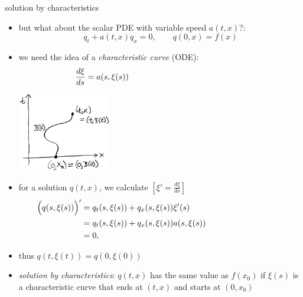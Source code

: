 \documentclass[10pt,hyperref]{beamer}
\newcommand{\ds}{\displaystyle}
\begin{document}
\begin{frame}{solution by characteristics}

\begin{itemize}
\item but what about the scalar PDE with variable speed $a(t,x)$?:
    $$q_t + a(t,x) q_x=0, \qquad q(0,x) = f(x)$$
\item we need the idea of a \emph{characteristic curve} (ODE):
    $$\ds \frac{d\xi}{ds} = a(s,\xi(s)) \hspace{50mm}$$

\vspace{-10mm}

\hfill \includegraphics[width=0.32\textwidth]{figs/characteristicsketch}

\vspace{-20mm}
\item for a solution $q(t,x)$, we calculate $\left[\xi'=\tfrac{d\xi}{ds}\right]$
\begin{align*}
\Big(q(s,\xi(s))\Big)' &= q_t(s,\xi(s)) + q_x(s,\xi(s)) \xi'(s) \hspace{40mm} \\
                          &= q_t(s,\xi(s)) + q_x(s,\xi(s)) a(s,\xi(s)) \\
                          &= 0,
\end{align*}
\item thus $q(t,\xi(t)) = q(0,\xi(0))$
\item \emph{solution by characteristics}: $q(t,x)$ has the same value as $f(x_0)$ if $\xi(s)$ is a characteristic curve that ends at $(t,x)$ and starts at $(0,x_0)$
\end{itemize}
\end{frame}
\end{document}
